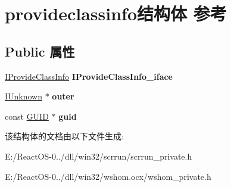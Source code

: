 \hypertarget{structprovideclassinfo}{}\section{provideclassinfo结构体 参考}
\label{structprovideclassinfo}
\subsection*{Public 属性}
\begin{DoxyCompactItemize}
\item 
\mbox{\label{structprovideclassinfo_abb4bc7006bea51eef00a3fd784addbb5}} 
\hyperlink{interface_i_provide_class_info}{I\+Provide\+Class\+Info} {\bfseries I\+Provide\+Class\+Info\+\_\+iface}
\item 
\mbox{\label{structprovideclassinfo_a209d01cc6a4d7a85c0fc19e832ead431}} 
\hyperlink{interface_i_unknown}{I\+Unknown} $\ast$ {\bfseries outer}
\item 
\mbox{\label{structprovideclassinfo_a475721beb7a4a849cdfef538387808b0}} 
const \hyperlink{interface_g_u_i_d}{G\+U\+ID} $\ast$ {\bfseries guid}
\end{DoxyCompactItemize}


该结构体的文档由以下文件生成\+:\begin{DoxyCompactItemize}
\item 
E\+:/\+React\+O\+S-\/0../dll/win32/scrrun/scrrun\+\_\+private.\+h\item 
E\+:/\+React\+O\+S-\/0../dll/win32/wshom.\+ocx/wshom\+\_\+private.\+h\end{DoxyCompactItemize}
